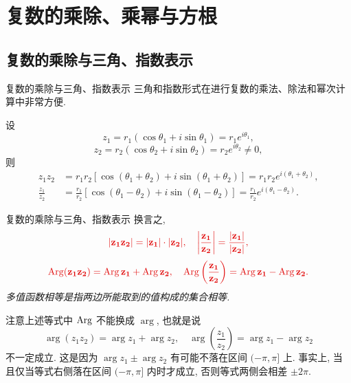 \section{复数的乘除、乘幂与方根}

\subsection{复数的乘除与三角、指数表示}
\begin{frame}{复数的乘除与三角、指数表示}
	\onslide<+->
	三角和指数形式在进行复数的乘法、除法和幂次计算中非常方便.

	\onslide<+->
	\begin{theorem}
		设
		\[z_1=r_1(\cos\theta_1+i\sin\theta_1)=r_1e^{i\theta_1},\]
		\[z_2=r_2(\cos\theta_2+i\sin\theta_2)=r_2e^{i\theta_2}\neq 0,\]
		则
		\begin{align*}
			z_1z_2&=r_1r_2[\cos(\theta_1+\theta_2)+i\sin(\theta_1+\theta_2)]=r_1r_2e^{i(\theta_1+\theta_2)},\\
			\frac{z_1}{z_2}&=\frac{r_1}{r_2}[\cos(\theta_1-\theta_2)+i\sin(\theta_1-\theta_2)]=\frac{r_1}{r_2}e^{i(\theta_1-\theta_2)}.
		\end{align*}
	\end{theorem}
\end{frame}


\begin{frame}{复数的乘除与三角、指数表示}
	\onslide<+->
	换言之,
	\[\alert{|z_1z_2|=|z_1|\cdot|z_2|,\quad\abs{\frac{z_1}{z_2}}=\frac{|z_1|}{|z_2|},}\]
	\onslide<+->
	\[\alert{\Arg(z_1z_2)=\Arg z_1+\Arg z_2,\quad
	\Arg\left(\frac{z_1}{z_2}\right)=\Arg z_1-\Arg z_2.}\]
	\onslide<+->
	\emph{多值函数相等是指两边所能取到的值构成的集合相等.}

	\onslide<+->
	注意上述等式中 $\operatorname{Arg}$ 不能换成 $\arg$, 也就是说
	\[\arg(z_1z_2)=\arg z_1+\arg z_2,\quad
	\arg\left(\frac{z_1}{z_2}\right)=\arg z_1-\arg z_2\]
	\alert{不一定成立}.
	\onslide<+->
	这是因为 $\arg z_1\pm\arg z_2$ 有可能不落在区间 $(-\pi,\pi]$ 上.
	\onslide<+->
	事实上, 当且仅当等式右侧落在区间 $(-\pi,\pi]$ 内时才成立, 否则等式两侧会相差 $\pm2\pi$.
\end{frame}


